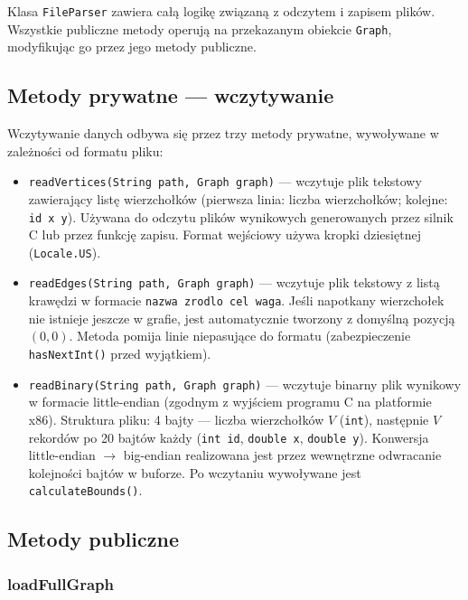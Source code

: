 \documentclass[a4paper, 11pt]{article}
\begin{document}
Klasa \texttt{FileParser} zawiera całą logikę związaną z odczytem
i zapisem plików. Wszystkie publiczne metody operują na przekazanym
obiekcie \texttt{Graph}, modyfikując go przez jego metody publiczne.

\subsection{Metody prywatne --- wczytywanie}

Wczytywanie danych odbywa się przez trzy metody prywatne, wywoływane
w zależności od formatu pliku:

\begin{itemize}
  \item \texttt{readVertices(String path, Graph graph)} --- wczytuje
    plik tekstowy zawierający listę wierzchołków (pierwsza linia: liczba
    wierzchołków; kolejne: \texttt{id x y}). Używana do odczytu plików
    wynikowych generowanych przez silnik C lub przez funkcję zapisu.
    Format wejściowy używa kropki dziesiętnej (\texttt{Locale.US}).

  \item \texttt{readEdges(String path, Graph graph)} --- wczytuje
    plik tekstowy z listą krawędzi w formacie \texttt{nazwa zrodlo cel waga}.
    Jeśli napotkany wierzchołek nie istnieje jeszcze w grafie, jest
    automatycznie tworzony z domyślną pozycją $(0, 0)$. Metoda pomija
    linie niepasujące do formatu (zabezpieczenie \texttt{hasNextInt()}
    przed wyjątkiem).

  \item \texttt{readBinary(String path, Graph graph)} --- wczytuje
    binarny plik wynikowy w formacie little-endian (zgodnym z wyjściem
    programu C na platformie x86). Struktura pliku: 4 bajty --- liczba
    wierzchołków $V$ (\texttt{int}), następnie $V$ rekordów po 20 bajtów
    każdy (\texttt{int id}, \texttt{double x}, \texttt{double y}).
    Konwersja little-endian $\rightarrow$ big-endian realizowana jest
    przez wewnętrzne odwracanie kolejności bajtów w buforze.
    Po wczytaniu wywoływane jest \texttt{calculateBounds()}.
\end{itemize}

\subsection{Metody publiczne}

\subsubsection{loadFullGraph}
\end{document}

